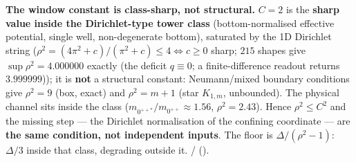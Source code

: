 \textbf{The window constant is class-sharp, not structural.} $C=2$ is the \textbf{sharp value inside
the Dirichlet-type tower class} (bottom-normalised effective potential, single well, non-degenerate
bottom), saturated by the 1D Dirichlet string ($\rho^2=(4\pi^2+c)/(\pi^2+c)\le4\iff c\ge0$ sharp; $215$
shapes give $\sup\rho^2=4.000000$ exactly (the deficit $q\equiv0$; a finite-difference readout returns $3.999999$)); it is \textbf{not} a structural constant: Neumann/mixed boundary
conditions give $\rho^2=9$ (box, exact) and $\rho^2=m+1$ (star $K_{1,m}$, unbounded). The physical
channel sits inside the class ($m_{0^{++*}}/m_{0^{++}}\approx1.56$, $\rho^2=2.43$). Hence
$\rho^2\le C^2$ and the missing step --- the Dirichlet normalisation of the confining coordinate ---
are \textbf{the same condition, not independent inputs}. The floor is $\Delta/(\rho^2-1)$:
$\Delta/3$ inside that class, degrading outside it. \LC/\LM{} ().

